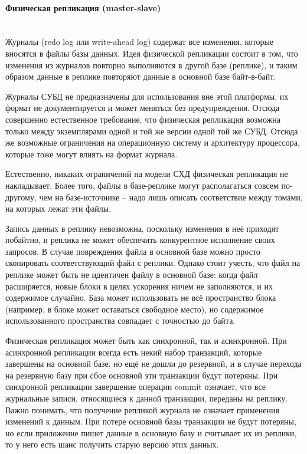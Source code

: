 \paragraph{Физическая репликация (master-slave)} ~\\
Журналы (redo log или write-ahead log) содержат все изменения, которые вносятся в файлы базы данных. Идея физической
репликации состоит в том, что изменения из журналов повторно выполняются в другой базе (реплике), и таким образом данные
в реплике повторяют данные в основной базе байт-в-байт.

Журналы СУБД не предназначены для использования вне этой платформы, их формат не документируется и может меняться без
предупреждения. Отсюда совершенно естественное требование, что физическая репликация возможна только между экземплярами
одной и той же версии одной той же СУБД. Отсюда же возможные ограничения на операционную систему и архитектуру
процессора, которые тоже могут влиять на формат журнала.

Естественно, никаких ограничений на модели СХД физическая репликация не накладывает. Более того, файлы в базе-реплике
могут располагаться совсем по-другому, чем на базе-источнике – надо лишь описать соответствие между томами, на которых
лежат эти файлы.

Запись данных в реплику невозможна, поскольку изменения в неё приходят побайтно, и реплика не может обеспечить
конкурентное исполнение своих запросов. В случае повреждения файла в основной базе можно просто скопировать
соответствующий файл с реплики. Однако стоит учесть, что файл на реплике может быть не идентичен файлу в основной базе:
когда файл расширяется, новые блоки в целях ускорения ничем не заполняются, и их содержимое случайно. База может
использовать не всё пространство блока (например, в блоке может оставаться свободное место), но содержимое
использованного пространства совпадает с точностью до байта.

Физическая репликация может быть как синхронной, так и асинхронной. При асинхронной репликации всегда есть некий набор
транзакций, которые завершены на основной базе, но ещё не дошли до резервной, и в случае перехода на резервную базу при
сбое основной эти транзакции будут потеряны. При синхронной репликации завершение операции commit означает, что все
журнальные записи, относящиеся к данной транзакции, переданы на реплику. Важно понимать, что получение репликой журнала
не означает применения изменений к данным. При потере основной базы транзакции не будут потеряны, но если приложение
пишет данные в основную базу и считывает их из реплики, то у него есть шанс получить старую версию этих данных.

